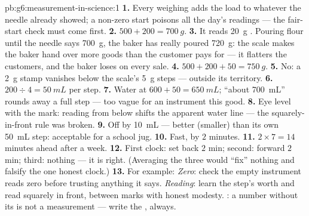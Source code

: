 \begin{solution}{pb:g6:measurement-in-science:1}
\textbf{1.} Every weighing adds the load to whatever the needle
already showed; a non-zero start poisons all the day's readings ---
the fair-start check must come first.
\textbf{2.} $500 + 200 = \qty{700}{g}$.
\textbf{3.} It reads \qty{20}{g} . Pouring flour until the
needle says \qty{700}{g}, the baker has really poured
\qty{720}{g}: the scale makes the baker hand over more goods than
the customer pays for --- it flatters the customers, and the baker
loses on every sale.
\textbf{4.} $500 + 200 + 50 = \qty{750}{g}$.
\textbf{5.} No: a \qty{2}{g} stamp vanishes below the scale's
\qty{5}{g} steps --- outside its territory.
\textbf{6.} $200 \div 4 = \qty{50}{mL}$ per step.
\textbf{7.} Water at $600 + 50 = \qty{650}{mL}$; ``about
\qty{700}{mL}'' rounds away a full step --- too vague for an
instrument this good.
\textbf{8.} Eye level with the mark: reading from below shifts the
apparent water line --- the squarely-in-front rule was broken.
\textbf{9.} Off by \qty{10}{mL} --- better (smaller) than its own
\qty{50}{mL} step: acceptable for a school jug.
\textbf{10.} Fast, by $2$ minutes.
\textbf{11.} $2 \times 7 = 14$ minutes ahead after a week.
\textbf{12.} First clock: set back $2$ min; second: forward $2$
min; third: nothing --- it is right. (Averaging the three would
``fix'' nothing and falsify the one honest clock.)
\textbf{13.} For example: \emph{Zero}: check the empty instrument
reads zero before trusting anything it says. \emph{Reading}: learn
the step's worth and read squarely in front, between marks with
honest modesty. \emph{}: a number without its  is not a
measurement --- write the , always.
\end{solution}
